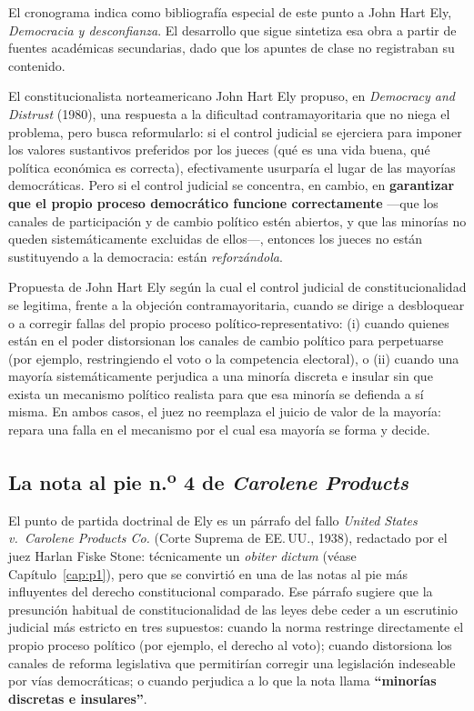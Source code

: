 \documentclass[12pt,oneside]{book}
\begin{document}
\begin{notebox}
El cronograma indica como bibliografía especial de este punto a John Hart Ely,
\textit{Democracia y desconfianza}. El desarrollo que sigue sintetiza esa obra a
partir de fuentes académicas secundarias, dado que los apuntes de clase no
registraban su contenido.
\end{notebox}

El constitucionalista norteamericano John Hart Ely propuso, en \textit{Democracy
and Distrust} (1980), una respuesta a la dificultad contramayoritaria que no niega
el problema, pero busca reformularlo: si el control judicial se ejerciera para
imponer los valores sustantivos preferidos por los jueces (qué es una vida buena,
qué política económica es correcta), efectivamente usurparía el lugar de las
mayorías democráticas. Pero si el control judicial se concentra, en cambio, en
\textbf{garantizar que el propio proceso democrático funcione correctamente} —que
los canales de participación y de cambio político estén abiertos, y que las
minorías no queden sistemáticamente excluidas de ellos—, entonces los jueces no
están sustituyendo a la democracia: están \textit{reforzándola}.

\begin{defbox}
Propuesta de John Hart Ely según la cual el control judicial de constitucionalidad
se legitima, frente a la objeción contramayoritaria, cuando se dirige a
desbloquear o a corregir fallas del propio proceso político-representativo: (i)
cuando quienes están en el poder distorsionan los canales de cambio político para
perpetuarse (por ejemplo, restringiendo el voto o la competencia electoral), o (ii)
cuando una mayoría sistemáticamente perjudica a una minoría discreta e insular
sin que exista un mecanismo político realista para que esa minoría se defienda a
sí misma. En ambos casos, el juez no reemplaza el juicio de valor de la mayoría:
repara una falla en el mecanismo por el cual esa mayoría se forma y decide.
\end{defbox}

\subsection{La nota al pie n.\textsuperscript{o} 4 de \textit{Carolene Products}}

El punto de partida doctrinal de Ely es un párrafo del fallo \textit{United
States v.\ Carolene Products Co.} (Corte Suprema de EE.\,UU., 1938), redactado por
el juez Harlan Fiske Stone: técnicamente un \textit{obiter dictum}
(véase Capítulo~\ref{cap:p1}), pero que se convirtió en una de las notas al pie
más influyentes del derecho constitucional comparado. Ese párrafo sugiere que la
presunción habitual de constitucionalidad de las leyes debe ceder a un escrutinio
judicial más estricto en tres supuestos: cuando la norma restringe directamente el
propio proceso político (por ejemplo, el derecho al voto); cuando distorsiona los
canales de reforma legislativa que permitirían corregir una legislación
indeseable por vías democráticas; o cuando perjudica a lo que la nota llama
\textbf{``minorías discretas e insulares''}.
\end{document}
